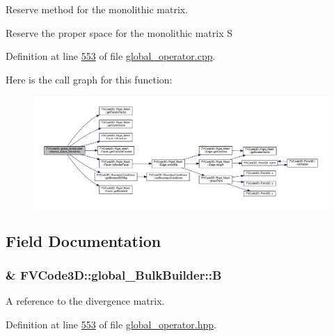 Reserve method for the monolithic matrix. 

Reserve the proper space for the monolithic matrix S 

Definition at line \hyperlink{global__operator_8cpp_source_l00553}{553} of file \hyperlink{global__operator_8cpp_source}{global\+\_\+operator.\+cpp}.



Here is the call graph for this function\+:
\nopagebreak
\begin{figure}[H]
\begin{center}
\leavevmode
\includegraphics[width=350pt]{classFVCode3D_1_1global__BulkBuilder_a4f1cfa8e5e8dff81e56993a7ecf9485d_cgraph}
\end{center}
\end{figure}




\subsection{Field Documentation}
\subsubsection[{\texorpdfstring{B}{B}}]{\& F\+V\+Code3\+D\+::global\+\_\+\+Bulk\+Builder\+::B\hspace{0.3cm}{\ttfamily [private]}}\hypertarget{classFVCode3D_1_1global__BulkBuilder_aceb03f04bf9045a8a0b139a7f24a31c3}{}\label{classFVCode3D_1_1global__BulkBuilder_aceb03f04bf9045a8a0b139a7f24a31c3}


A reference to the divergence matrix. 



Definition at line \hyperlink{global__operator_8hpp_source_l00553}{553} of file \hyperlink{global__operator_8hpp_source}{global\+\_\+operator.\+hpp}.

